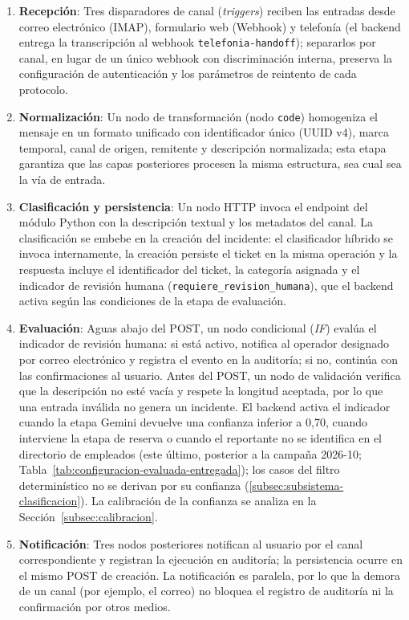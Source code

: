 \begin{enumerate}[leftmargin=*]
  \item \textbf{Recepción}: Tres disparadores de canal (\emph{triggers}) reciben las entradas desde correo electrónico (IMAP), formulario web (Webhook) y telefonía (el backend entrega la transcripción al webhook \texttt{telefonia-handoff}); separarlos por canal, en lugar de un único webhook con discriminación interna, preserva la configuración de autenticación y los parámetros de reintento de cada protocolo.
  \item \textbf{Normalización}: Un nodo de transformación (nodo \texttt{code}) homogeniza el mensaje en un formato unificado \parencite{Hohpe2004_eip} con identificador único (UUID v4), marca temporal, canal de origen, remitente y descripción normalizada; esta etapa garantiza que las capas posteriores procesen la misma estructura, sea cual sea la vía de entrada.
  \item \textbf{Clasificación y persistencia}: Un nodo HTTP invoca el endpoint  del módulo Python con la descripción textual y los metadatos del canal. La clasificación se embebe en la creación del incidente: el clasificador híbrido se invoca internamente, la creación persiste el ticket en la misma operación y la respuesta incluye el identificador del ticket, la categoría asignada y el indicador de revisión humana (\texttt{requiere\_revision\_humana}), que el backend activa según las condiciones de la etapa de evaluación.
  \item \textbf{Evaluación}: Aguas abajo del POST, un nodo condicional (\emph{IF}) evalúa el indicador de revisión humana: si está activo, notifica al operador designado por correo electrónico y registra el evento en la auditoría; si no, continúa con las confirmaciones al usuario. Antes del POST, un nodo de validación verifica que la descripción no esté vacía y respete la longitud aceptada, por lo que una entrada inválida no genera un incidente. El backend activa el indicador cuando la etapa Gemini devuelve una confianza inferior a 0,70, cuando interviene la etapa de reserva o cuando el reportante no se identifica en el directorio de empleados (este último, posterior a la campaña 2026-10; Tabla~\ref{tab:configuracion-evaluada-entregada}); los casos del filtro determinístico no se derivan por su confianza (\autoref{subsec:subsistema-clasificacion}). La calibración de la confianza se analiza en la Sección~\ref{subsec:calibracion}.
  \item \textbf{Notificación}: Tres nodos posteriores notifican al usuario por el canal correspondiente y registran la ejecución en auditoría; la persistencia ocurre en el mismo POST de creación. La notificación es paralela, por lo que la demora de un canal (por ejemplo, el correo) no bloquea el registro de auditoría ni la confirmación por otros medios.
\end{enumerate}

